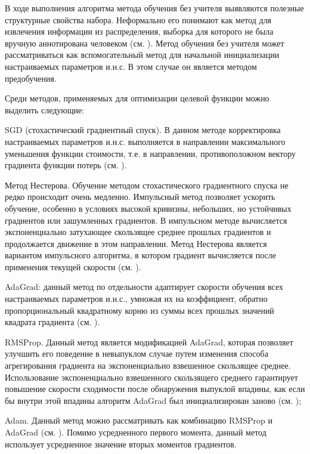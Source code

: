 В ходе выполнения алгоритма метода обучения без учителя выявляются полезные структурные свойства
набора. Неформально его понимают как метод для извлечения информации из распределения, выборка для которого
не была вручную аннотирована человеком (см. ). Метод обучения без учителя может рассматриваться как вспомогательный метод для начальной инициализации настраиваемых параметров и.н.с. В этом случае он является методом предобучения.

Среди методов, применяемых для оптимизации целевой функции можно выделить следующие:

\begin{textitemize}
	\item SGD (стохастический градиентный спуск). В данном методе корректировка настраиваемых параметров и.н.с. выполняется в направлении максимального уменьшения функции стоимости, т.е. в направлении, противоположном вектору градиента функции потерь (см. ).
	\item Метод Нестерова. Обучение методом стохастического градиентного спуска не редко происходит очень медленно. Импульсный метод позволяет ускорить обучение, особенно в условиях высокой кривизны, небольших, но устойчивых градиентов или зашумленных градиентов. В импульсном методе вычисляется экспоненциально затухающее скользящее среднее прошлых градиентов и продолжается движение в этом направлении. Метод Нестерова является вариантом импульсного алгоритма, в котором градиент вычисляется после применения текущей скорости (см. ).
	\item AdaGrad: данный метод по отдельности адаптирует скорости обучения всех настраиваемых параметров и.н.с., умножая их на коэффициент, обратно пропорциональный квадратному корню из суммы всех прошлых значений квадрата градиента (см. ).
	\item RMSProp. Данный метод является модификацией AdaGrad, которая позволяет улучшить его поведение в невыпуклом случае путем изменения способа агрегирования градиента на экспоненциально взвешенное скользящее среднее. Использование экспоненциально взвешенного скользящего среднего гарантирует повышение скорости сходимости после обнаружения выпуклой впадины, как если бы внутри этой впадины алгоритм AdaGrad был инициализирован заново (см. );
	\item Adam. Данный метод можно рассматривать как комбинацию RMSProp и AdaGrad (см. ). Помимо усредненного первого момента, данный метод использует усредненное значение вторых моментов градиентов.
\end{textitemize}


